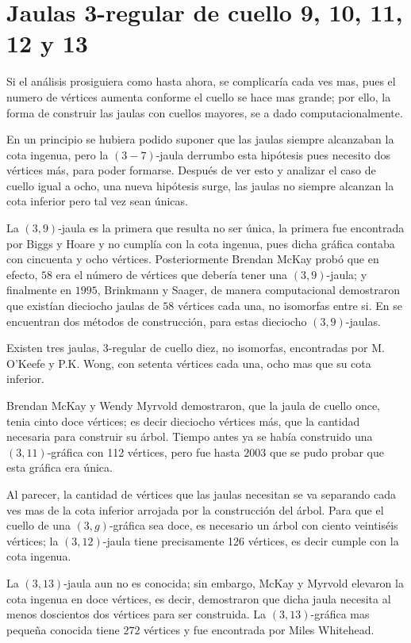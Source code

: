 \documentclass[12pt]{book}
\theoremstyle{definition}
\begin{document}
\section{Jaulas 3-regular de cuello 9, 10, 11, 12 y 13 }

Si el análisis prosiguiera como hasta ahora, se complicaría cada ves
mas, pues el numero de vértices aumenta conforme el cuello se hace mas
grande; por ello, la forma de construir las jaulas con cuellos
mayores, se a dado computacionalmente.

En un principio se hubiera podido suponer que las jaulas siempre
alcanzaban la cota ingenua, pero la $(3-7)$-jaula derrumbo esta
hipótesis pues necesito dos vértices más, para poder
formarse. Después de ver esto y analizar el caso de cuello igual a
ocho, una nueva hipótesis surge, las jaulas no siempre alcanzan la
cota inferior pero tal vez sean únicas.

La $(3,9)$-jaula es la primera que resulta no ser única, la primera
fue encontrada por Biggs y Hoare y no cumplía con la cota ingenua,
pues dicha gráfica contaba con cincuenta y ocho
vértices. Posteriormente Brendan McKay probó que en efecto, $58$ era
el número de vértices que debería tener una $(3,9)$-jaula; y
finalmente en $1995$, Brinkmann y Saager, de manera computacional
demostraron que existían dieciocho jaulas de $58$ vértices cada una,
no isomorfas entre si. En \cite{cuello10} se encuentran dos métodos de
construcción, para estas dieciocho $(3,9)$-jaulas.

Existen tres jaulas, 3-regular de cuello diez, no isomorfas,
encontradas por M. O'Keefe y P.K. Wong, con setenta vértices cada una,
ocho mas que su cota inferior.

Brendan McKay y Wendy Myrvold demostraron, que la jaula de cuello
once, tenia cinto doce vértices; es decir dieciocho vértices m\'as,
que la cantidad necesaria para construir su árbol. Tiempo antes ya se
había construido una $(3,11)$-gráfica con 112 vértices, pero fue hasta
$2003$ que se pudo probar que esta gráfica era única.

Al parecer, la cantidad de vértices que las jaulas necesitan se va
separando cada ves mas de la cota inferior arrojada por la
construcción del árbol. Para que el cuello de una $(3,g)$-gráfica sea
doce, es necesario un árbol con ciento veintiséis vértices; la
$(3,12)$-jaula tiene precisamente 126 vértices, es decir cumple con la
cota ingenua.

La $(3,13)$-jaula aun no es conocida; sin embargo, McKay y Myrvold
elevaron la cota ingenua en doce vértices, es decir, demostraron que
dicha jaula necesita al menos doscientos dos vértices para ser
construida. La $(3,13)$-gráfica mas pequeña conocida tiene $272$
vértices y fue encontrada por Miles Whitehead.
\end{document}
